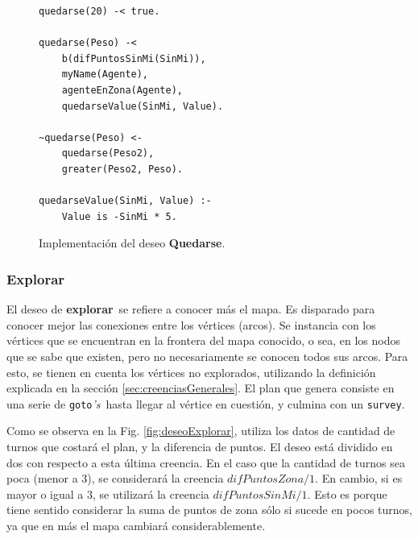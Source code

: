\documentclass[oneside]{book}
\theoremstyle{definition}
\newcommand{\lit}[1]{\mbox{$ #1$}}
\begin{document}
\begin{figure}
\begin{verbatim}
quedarse(20) -< true.

quedarse(Peso) -< 
    b(difPuntosSinMi(SinMi)),
    myName(Agente),
    agenteEnZona(Agente),
    quedarseValue(SinMi, Value).

~quedarse(Peso) <-
    quedarse(Peso2),
    greater(Peso2, Peso).

quedarseValue(SinMi, Value) :-   
    Value is -SinMi * 5.
\end{verbatim}
\caption{Implementación del deseo \textbf{Quedarse}.}
\label{fig:deseoQuedarse}
\end{figure}


\subsubsection{Explorar}

El deseo de \textbf{explorar}\ se refiere a conocer más el mapa. Es disparado para 
conocer mejor las conexiones entre los vértices (arcos). Se instancia con los vértices
que se encuentran en la frontera del mapa conocido, o sea, en los nodos que se sabe
que existen, pero no necesariamente se conocen todos sus arcos. Para esto, se tienen en 
cuenta los vértices no explorados, utilizando la definición explicada en la 
sección \ref{sec:creenciasGenerales}. El plan que genera 
consiste en una serie de \texttt{goto}\textit{'s}\ hasta llegar al vértice en cuestión, y 
culmina con un \texttt{survey}.



Como se observa en la Fig. \ref{fig:deseoExplorar}, utiliza los datos de cantidad de 
turnos que costará el plan, y la diferencia de puntos.
El deseo está dividido en dos con respecto a esta última creencia. En el caso que la
cantidad de turnos sea poca (menor a 3), se considerará la creencia 
\lit{difPuntosZona/1}. En cambio, si es mayor o igual a 3, se utilizará la creencia
\lit{difPuntosSinMi/1}. Esto es porque tiene sentido considerar la suma de puntos
de zona sólo si sucede en pocos turnos, ya que en más el mapa cambiará 
considerablemente. 
\end{document}
